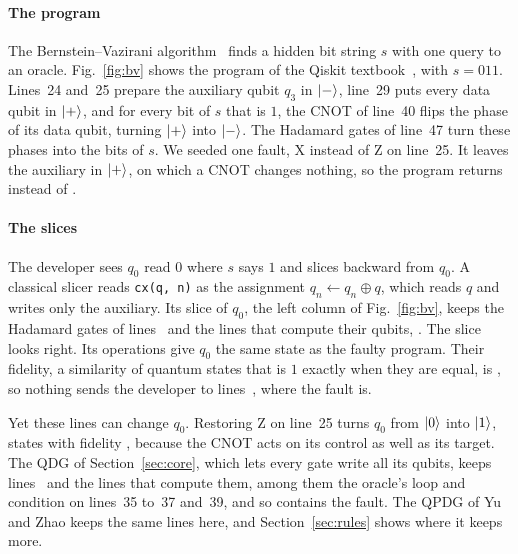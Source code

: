 \paragraph*{The program}
The Bernstein--Vazirani algorithm~\cite{bernstein1997qct} finds a hidden bit string $s$ with one query to an oracle.
Fig.~\ref{fig:bv} shows the program of the Qiskit textbook~\cite{qiskittextbook}, with $s = 011$. Lines~24 and~25
prepare the auxiliary qubit $q_3$ in $\lvert -\rangle$, line~29 puts every data qubit in $\lvert +\rangle$, and for every bit of $s$
that is $1$, the CNOT of line~40 flips the phase of its data qubit, turning $\lvert +\rangle$ into $\lvert -\rangle$. The Hadamard
gates of line~47 turn these phases into the bits of $s$. We seeded one fault, X instead of Z on line~25. It leaves
the auxiliary in $\lvert +\rangle$, on which a CNOT changes nothing, so the program returns \numBvBuggyOut{} instead of
\numBvFixedOut{}.

\paragraph*{The slices}
The developer sees $q_0$ read $0$ where $s$ says $1$ and slices backward from $q_0$. A classical slicer reads
\texttt{cx(q, n)} as the assignment $q_n \leftarrow q_n \oplus q$, which reads $q$ and writes only the auxiliary. Its
slice of $q_0$, the left column of Fig.~\ref{fig:bv}, keeps the Hadamard gates of lines~\numBvCpdgLines{} and the
lines that compute their qubits, \numBvCpdgClassical{}. The slice looks right. Its \numBvCpdgOps{} operations give
$q_0$ the same state as the faulty program. Their fidelity, a similarity of quantum states that is $1$ exactly when
they are equal, is \numBvCpdgFidelity{}, so nothing sends the developer to lines~\numBvMissedLines{}, where the
fault is.

Yet these lines can change $q_0$. Restoring Z on line~25 turns $q_0$ from $\lvert 0\rangle$ into $\lvert 1\rangle$, states with
fidelity \numBvFixFidelity{}, because the CNOT acts on its control as well as its target. The QDG of
Section~\ref{sec:core}, which lets every gate write all its qubits, keeps lines~\numBvQdgLines{} and the lines that
compute them, among them the oracle's loop and condition on lines~35 to~37 and~39, and so contains the fault. The QPDG of Yu
and Zhao keeps the same lines here, and Section~\ref{sec:rules} shows where it keeps
more.

